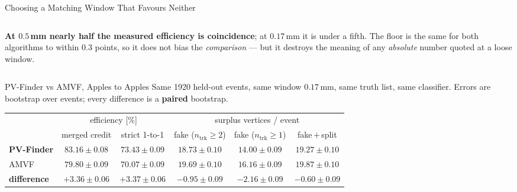 \documentclass[xcolor=table,aspectratio=169]{beamer}
\newcommand{\ntrk}{\ensuremath{n_\mathrm{trk}}}
\begin{document}
\begin{frame}{Choosing a Matching Window That Favours Neither}
\begin{columns}[t]
\begin{column}{0.5\linewidth}
            \textbf{At $0.5$\,mm nearly half the measured efficiency is coincidence};
            at $0.17$\,mm it is under a fifth. The floor is the same for both
            algorithms to within $0.3$ points, so it does not bias the
            \emph{comparison} --- but it destroys the meaning of any \emph{absolute}
            number quoted at a loose window.
        \end{column}
    \end{columns}
\end{frame}

\begin{frame}{PV-Finder vs AMVF, Apples to Apples}
    \vspace{-0.2em}
    \centering
    \scriptsize
    Same 1920 held-out events, same window $0.17$\,mm, same truth list, same
    classifier. Errors are bootstrap over events; every difference is a
    \textbf{paired} bootstrap.
    \vspace{0.25em}

    \setlength{\tabcolsep}{5pt}
    \begin{tabular}{lccccc}
        \toprule
        & \multicolumn{2}{c}{efficiency [\%]} & \multicolumn{3}{c}{surplus vertices / event} \\
        \cmidrule(lr){2-3}\cmidrule(lr){4-6}
        & merged credit & strict 1-to-1 & fake ($\ntrk\!\geq\!2$) & fake ($\ntrk\!\geq\!1$) & fake\,$+$\,split \\
        \midrule
        \textbf{PV-Finder} & $83.16 \pm 0.08$ & $73.43 \pm 0.09$ & $18.73 \pm 0.10$ & $14.00 \pm 0.09$ & $19.27 \pm 0.10$ \\
        AMVF               & $79.80 \pm 0.09$ & $70.07 \pm 0.09$ & $19.69 \pm 0.10$ & $16.16 \pm 0.09$ & $19.87 \pm 0.10$ \\
        \midrule
        \textbf{difference} & $\mathbf{+3.36 \pm 0.06}$ & $\mathbf{+3.37 \pm 0.06}$ & $\mathbf{-0.95 \pm 0.09}$ & $\mathbf{-2.16 \pm 0.09}$ & $\mathbf{-0.60 \pm 0.09}$ \\
        \bottomrule
    \end{tabular}
    \vspace{0.5em}


\end{frame}
\end{document}
